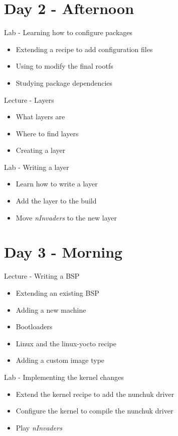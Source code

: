 \documentclass[a4paper,12pt,obeyspaces,spaces,hyphens]{article}
\begin{document}
\section{Day 2 - Afternoon}

\feagendaonecolumn
{Lab - Learning how to configure packages}
{
  \begin{itemize}
  \item Extending a recipe to add configuration files
  \item Using  to modify the final rootfs
  \item Studying package dependencies
  \end{itemize}
}
\feagendatwocolumn
{Lecture - Layers}
{
  \begin{itemize}
  \item What layers are
  \item Where to find layers
  \item Creating a layer
  \end{itemize}
}
{Lab - Writing a layer}
{
  \begin{itemize}
  \item Learn how to write a layer
  \item Add the layer to the build
  \item Move {\em nInvaders} to the new layer
  \end{itemize}
}

\section{Day 3 - Morning}

\feagendatwocolumn
{Lecture - Writing a BSP}
{
  \begin{itemize}
  \item Extending an existing BSP
  \item Adding a new machine
  \item Bootloaders
  \item Linux and the linux-yocto recipe
  \item Adding a custom image type
  \end{itemize}
}
{Lab - Implementing the kernel changes}
{
  \begin{itemize}
  \item Extend the kernel recipe to add the nunchuk driver
  \item Configure the kernel to compile the nunchuk driver
  \item Play {\em nInvaders}
  \end{itemize}
}
\end{document}
